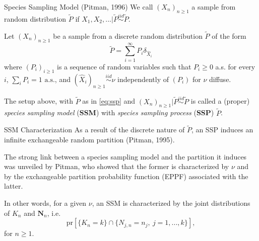 \documentclass[11pt, handout]{beamer}
\begin{document}
\begin{frame}{Species Sampling Model (Pitman, 1996)}
    We call \((X_n)_{n \geq 1}\) a sample from random distribution \(\tilde{P}\) if \(X_1,X_2,... | \tilde{P} \overset{iid}{\sim} \tilde{P}\).
    \begin{definition}
        \label{th:ssm}
        Let \((X_n)_{n \geq 1}\) be a sample from a discrete random distribution \(\tilde{P}\) of the form
        \begin{equation}
            \label{eq:ssp}
            \tilde{P} = \sum_{i = 1}^{\infty} P_{i} \delta_{\hat{X}_i}
        \end{equation}
        where \((P_i)_{i \geq 1}\) is a sequence of random variables such that \(P_i \geq 0\) a.s. for every \(i\), \(\sum_i P_i = 1 \text{ a.s.}\), and \((\hat{X}_i)_{n \geq 1} \overset{iid}{\sim} \nu\) independently of \((P_i)\) for \(\nu\) diffuse.
        \medskip
        
        The setup above, with \(\tilde{P}\) as in \eqref{eq:ssp} and \((X_n)_{n \geq 1} | \tilde{P} \overset{iid}{\sim} \tilde{P}\) is called a (proper) \textit{species sampling model} (\textbf{SSM}) with \textit{species sampling process} (\textbf{SSP}) \(\tilde{P}\).
    \end{definition}
\end{frame}

\begin{frame}{SSM Characterization}
    As a result of the discrete nature of \(\tilde{P}\), an SSP induces an infinite exchangeable random partition (Pitman, 1995).
    \medskip
    
    The strong link between a species sampling model and the partition it induces was unveiled by Pitman, who showed that the former is characterized by \(\nu\) and by the exchangeable partition probability function (EPPF) associated with the latter. 
    \medskip
    
    In other words, for a given \(\nu\), an SSM is characterized by the joint distributions of \(K_n\) and \(\mathbf{N}_n\), i.e.
    \begin{equation*}
        \text{pr}[\{K_n = k\} \cap \{N_{j,n} = n_j,\ j = 1,...,k\}],
    \end{equation*}
    for \(n \geq 1\).
\end{frame}
\end{document}
